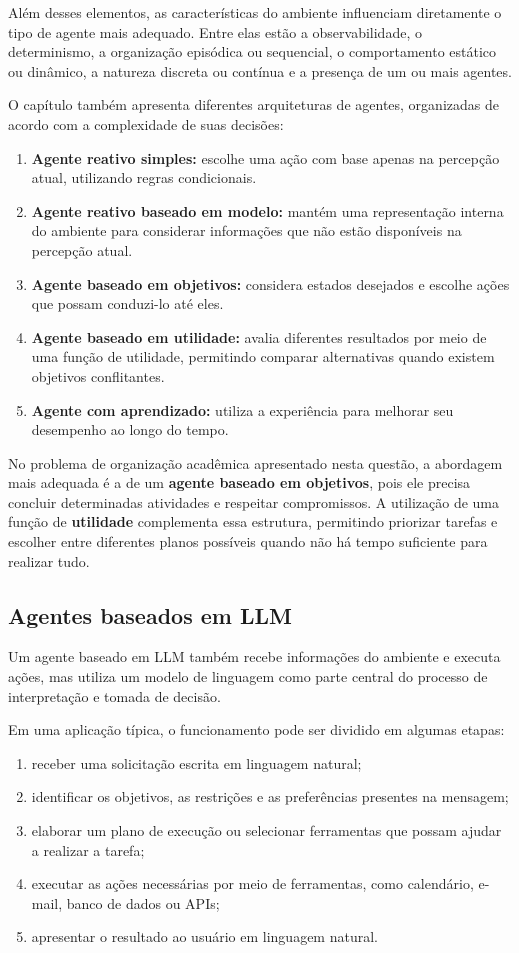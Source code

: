 \documentclass[12pt, a4paper]{article}
\begin{document}
Além desses elementos, as características do ambiente influenciam diretamente o tipo de agente mais adequado. Entre elas estão a observabilidade, o determinismo, a organização episódica ou sequencial, o comportamento estático ou dinâmico, a natureza discreta ou contínua e a presença de um ou mais agentes.

O capítulo também apresenta diferentes arquiteturas de agentes, organizadas de acordo com a complexidade de suas decisões:
\begin{enumerate}[leftmargin=2em]
  \item \textbf{Agente reativo simples:} escolhe uma ação com base apenas na percepção atual, utilizando regras condicionais.
  \item \textbf{Agente reativo baseado em modelo:} mantém uma representação interna do ambiente para considerar informações que não estão disponíveis na percepção atual.
  \item \textbf{Agente baseado em objetivos:} considera estados desejados e escolhe ações que possam conduzi-lo até eles.
  \item \textbf{Agente baseado em utilidade:} avalia diferentes resultados por meio de uma função de utilidade, permitindo comparar alternativas quando existem objetivos conflitantes.
  \item \textbf{Agente com aprendizado:} utiliza a experiência para melhorar seu desempenho ao longo do tempo.
\end{enumerate}

No problema de organização acadêmica apresentado nesta questão, a abordagem mais adequada é a de um \textbf{agente baseado em objetivos}, pois ele precisa concluir determinadas atividades e respeitar compromissos. A utilização de uma função de \textbf{utilidade} complementa essa estrutura, permitindo priorizar tarefas e escolher entre diferentes planos possíveis quando não há tempo suficiente para realizar tudo.

\subsection{Agentes baseados em LLM}

Um agente baseado em LLM também recebe informações do ambiente e executa ações, mas utiliza um modelo de linguagem como parte central do processo de interpretação e tomada de decisão.

Em uma aplicação típica, o funcionamento pode ser dividido em algumas etapas:
\begin{enumerate}[leftmargin=2em]
  \item receber uma solicitação escrita em linguagem natural;
  \item identificar os objetivos, as restrições e as preferências presentes na mensagem;
  \item elaborar um plano de execução ou selecionar ferramentas que possam ajudar a realizar a tarefa;
  \item executar as ações necessárias por meio de ferramentas, como calendário, e-mail, banco de dados ou APIs;
  \item apresentar o resultado ao usuário em linguagem natural.
\end{enumerate}
\end{document}
